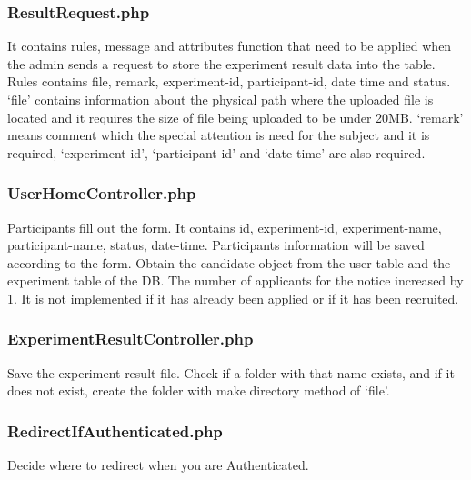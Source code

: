 \documentclass[letterpaper, 10 pt, conference]{ieeeconf}  %
\begin{document}
\subsubsection{ResultRequest.php}
It contains rules, message and attributes function that need to be applied when the admin sends a request to store the experiment result data into the table.  Rules contains  file, remark, experiment-id, participant-id, date time and status. ‘file’ contains information about the physical path where the uploaded file is located and it requires the size of file being uploaded to be under 20MB. ‘remark’ means comment which the special attention is need for the subject and it is required, ‘experiment-id’, ‘participant-id’ and ‘date-time’ are also required.\\
\subsubsection{UserHomeController.php} 
Participants fill out the form. It contains id, experiment-id, experiment-name, participant-name, status, date-time. Participants information will be saved according to the form. Obtain the candidate object from the user table and the experiment table of the DB. The number of applicants for the notice increased by 1. It is not implemented if it has already been applied or if it has been recruited.\\
\subsubsection{ExperimentResultController.php}
Save the experiment-result file. Check if a folder with that name  exists,  and  if  it does not exist, create the folder with make directory method of ‘file'.\\
\subsubsection{RedirectIfAuthenticated.php}
Decide  where  to  redirect when you are Authenticated.\\
\end{document}
